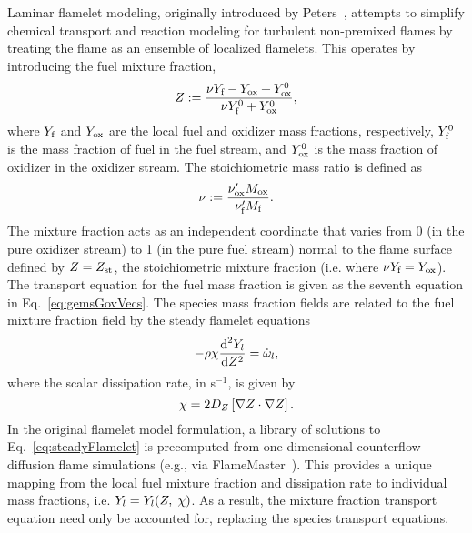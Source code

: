 Laminar flamelet modeling, originally introduced by Peters~\cite{Peters1984}, attempts to simplify chemical transport and reaction modeling for turbulent non-premixed flames by treating the flame as an ensemble of localized flamelets. This operates by introducing the fuel mixture fraction,
%
\begin{equation}\label{eq:mixFracDef}
    Z := \frac{ \nu Y_{\text{f}} - Y_{\text{ox}} + Y^0_{\text{ox}} }{ \nu Y^0_{\text{f}} + Y^0_{\text{ox}} },
\end{equation}
%
where $Y_{\text{f}}$ and $Y_{\text{ox}}$ are the local fuel and oxidizer mass fractions, respectively, $Y^0_{\text{f}}$ is the mass fraction of fuel in the fuel stream, and $Y^0_{\text{ox}}$ is the mass fraction of oxidizer in the oxidizer stream. The stoichiometric mass ratio is defined as
%
\begin{equation}
	\nu := \frac{\nu'_{\text{ox}} M_{\text{ox}}}{\nu'_{\text{f}} M_{\text{f}}}.
\end{equation}
%
The mixture fraction acts as an independent coordinate that varies from 0 (in the pure oxidizer stream) to 1 (in the pure fuel stream) normal to the flame surface defined by $Z = Z_{\text{st}}$, the stoichiometric mixture fraction (i.e. where $\nu Y_{\text{f}} = Y_{\text{ox}}$). The transport equation for the fuel mass fraction is given as the seventh equation in Eq.~\ref{eq:gemsGovVecs}. The species mass fraction fields are related to the fuel mixture fraction field by the steady flamelet equations
%
\begin{equation}\label{eq:steadyFlamelet}
	-\rho \chi \frac{\text{d} ^2 Y_{l}}{\text{d} Z^2} = \dot{\omega}_{l},
\end{equation}
%
where the scalar dissipation rate, in s$^{-1}$, is given by
\begin{equation}
	\chi = 2 D_{Z} \left[\nabla Z \cdot \nabla Z\right].
\end{equation}
%
In the original flamelet model formulation, a library of solutions to Eq.~\ref{eq:steadyFlamelet} is precomputed from one-dimensional counterflow diffusion flame simulations (e.g., via FlameMaster~\cite{flamemaster}). This provides a unique mapping from the local fuel mixture fraction and dissipation rate to individual mass fractions, i.e. $Y_{l} = Y_{l}(Z, \; \chi)$. As a result, the mixture fraction transport equation need only be accounted for, replacing the species transport equations.


